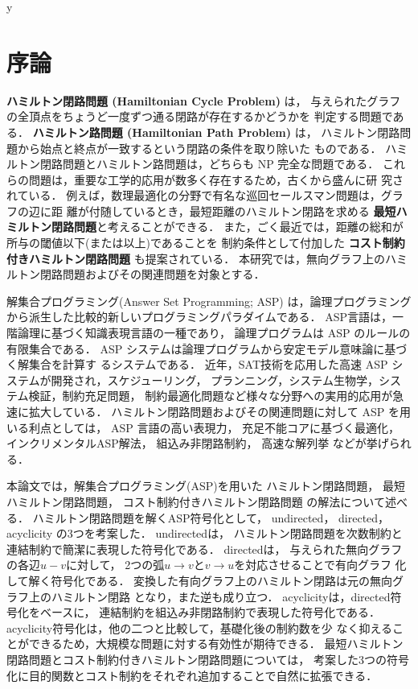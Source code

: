 y%
\chapter{序論}

\textbf{ハミルトン閉路問題 (Hamiltonian Cycle Problem)} は，
与えられたグラフの全頂点をちょうど一度ずつ通る閉路が存在するかどうかを
判定する問題である\cite{hirata15:book}．
\textbf{ハミルトン路問題 (Hamiltonian Path Problem)} は，
ハミルトン閉路問題から始点と終点が一致するという閉路の条件を取り除いた
ものである．
ハミルトン閉路問題とハミルトン路問題は，どちらも NP 完全な問題である．
これらの問題は，重要な工学的応用が数多く存在するため，古くから盛んに研
究されている．
例えば，数理最適化の分野で有名な巡回セールスマン問題は，グラフの辺に距
離が付随しているとき，最短距離のハミルトン閉路を求める
\textbf{最短ハミルトン閉路問題}と考えることができる．
また，ごく最近では，距離の総和が所与の閾値以下(または以上)であることを
制約条件として付加した
\textbf{コスト制約付きハミルトン閉路問題}
も提案されている\cite{comp20:Minato}．
本研究では，無向グラフ上のハミルトン閉路問題およびその関連問題を対象とする．

解集合プログラミング(Answer Set Programming; ASP\cite{%
  Baral03:cambridge,%
  Gelfond88:iclp,%
  Inoue08:jssst,%
  Niemela99:amai})
は，論理プログラミングから派生した比較的新しいプログラミングパラダイムである．
ASP言語は，一階論理に基づく知識表現言語の一種であり，
論理プログラムは ASP のルールの有限集合である．
ASP システムは論理プログラムから安定モデル意味論に基づく解集合を計算す
るシステムである．
近年，SAT技術を応用した高速 ASP システムが開発され，スケジューリング，
プランニング，システム生物学，システム検証，制約充足問題，
制約最適化問題など様々な分野への実用的応用が急速に拡大している．
ハミルトン閉路問題およびその関連問題に対して ASP を用いる利点としては，
ASP 言語の高い表現力，
充足不能コアに基づく最適化，
インクリメンタルASP解法，
組込み非閉路制約，
高速な解列挙
などが挙げられる．

本論文では，解集合プログラミング(ASP)を用いた
ハミルトン閉路問題，
最短ハミルトン閉路問題，
コスト制約付きハミルトン閉路問題
の解法について述べる．
%
ハミルトン閉路問題を解くASP符号化として，
\textsf{undirected}，
\textsf{directed}，
\textsf{acyclicity}
の3つを考案した．
\textsf{undirected}は，
ハミルトン閉路問題を次数制約と連結制約で簡潔に表現した符号化である．
\textsf{directed}は，
与えられた無向グラフの各辺$u-v$に対して，
2つの弧$u\rightarrow v$と$v\rightarrow u$を対応させることで有向グラフ
化して解く符号化である．
変換した有向グラフ上のハミルトン閉路は元の無向グラフ上のハミルトン閉路
となり，また逆も成り立つ．
\textsf{acyclicity}は，\textsf{directed}符号化をベースに，
連結制約を組込み非閉路制約で表現した符号化である．
\textsf{acyclicity}符号化は，他の二つと比較して，基礎化後の制約数を少
なく抑えることができるため，大規模な問題に対する有効性が期待できる．
最短ハミルトン閉路問題とコスト制約付きハミルトン閉路問題については，
考案した3つの符号化に目的関数とコスト制約をそれぞれ追加することで自然に拡張できる．

